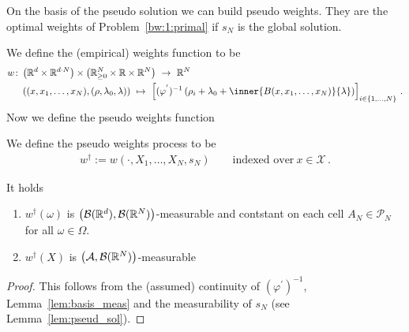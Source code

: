 On the basis of the pseudo solution we can build pseudo weights.
They are the optimal weights of Problem~\ref{bw:1:primal} if $s_N$ is the global solution. 

We define the (empirical) weights function to be
\begin{align*}
  w\colon
  &
  \left(
  \R^d\times \R^{d\cdot N}
  \right)
  \times
  \left(
  \R^N_{\ge 0}
  \times
  \R
  \times
  \R^{N}
  \right)
  \ 
  \to
  \ 
  \R^N
  \\
  &
  \left(
  (x,x_1,\ldots,x_N),(\rho,\lambda_0,\lambda)
  \right)
  \ 
  \mapsto
  \ 
  \left[
  (\varphi^{'})^{-1}
  \left(
    \rho_i
    +
    \lambda_0
    +
    \inner
    {B(x,x_1,\ldots,x_N)}{\lambda}
  \right)
\right]_{i\in \left\{
  1,\ldots,N
\right\}}
\,.
\end{align*}
Now we define the pseudo weights function
\begin{definition}
  We define the pseudo weights process to be
  \begin{align*}
    w^\dagger
    :=
    w(\cdot,X_1,\ldots,X_N,s_N)
    \qquad
    \text{indexed over}\ 
    x\in\mathcal{X}
    \,.
  \end{align*}
\end{definition}
\begin{lemma}
 It holds
 \begin{enumerate}[label=(\roman*)]
   \item
$w^\dagger(\omega)$ is 
$
\left(
\mathcal{B}(\mathbb{R}^d),\mathcal{B}(\mathbb{R}^N)
\right)
$-measurable 
and contstant on each cell $A_N\in\mathcal{P}_N$ for all $\omega\in\Omega$. 
\item
$w^\dagger(X)$ is 
$
\left(
  \mathcal{A},\mathcal{B}(\mathbb{R}^N)
\right)
$-measurable 
 \end{enumerate}
\end{lemma}
\begin{proof}
  This follows from the (assumed) continuity of 
  $
  (
  \varphi^{'}
  )^{-1}
  $,
  Lemma~\ref{lem:basis_meas} and the measurability of $s_N$ (see Lemma~\ref{lem:pseud_sol}).
\end{proof}



